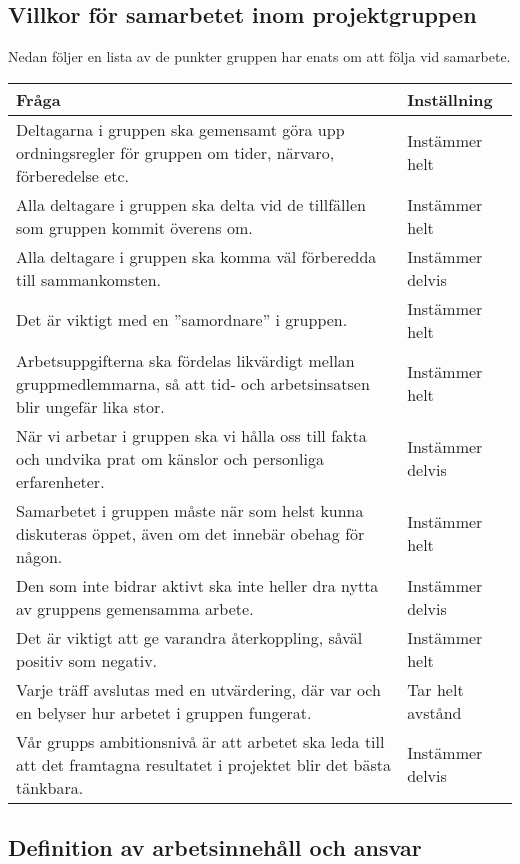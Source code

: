 \documentclass[projektplan/plan.tex]{subfiles}
\begin{document}
\subsection{Villkor för samarbetet inom projektgruppen}
\label{sec:doc}
Nedan följer en lista av de punkter gruppen har enats om att följa vid samarbete.
{\renewcommand{\arraystretch}{1.6}
\begin{longtable}{p{}p{}}
    \bfseries Fråga &
    \bfseries Inställning \\\hline
    Deltagarna i gruppen ska gemensamt göra upp ordningsregler för gruppen om
    tider, närvaro, förberedelse etc. &
    Instämmer helt
    \\
    Alla deltagare i gruppen ska delta vid de tillfällen som gruppen kommit
    överens om. &
    Instämmer helt
    \\
    Alla deltagare i gruppen ska komma väl förberedda till sammankomsten. &
    Instämmer delvis
    \\
    Det är viktigt med en ”samordnare” i gruppen. &
    Instämmer helt
    \\
    Arbetsuppgifterna ska fördelas likvärdigt mellan gruppmedlemmarna, så att
    tid- och arbetsinsatsen blir ungefär lika stor. &
    Instämmer helt
    \\
    När vi arbetar i gruppen ska vi hålla oss till fakta och undvika prat om
    känslor och personliga erfarenheter. &
    Instämmer delvis
    \\
    Samarbetet i gruppen måste när som helst kunna diskuteras öppet, även om
    det innebär obehag för någon. &
    Instämmer helt
    \\
    Den som inte bidrar aktivt ska inte heller dra nytta av gruppens gemensamma
    arbete. &
    Instämmer delvis
    \\
    Det är viktigt att ge varandra återkoppling, såväl positiv som negativ. &
    Instämmer helt
    \\
    Varje träff avslutas med en utvärdering, där var och en belyser hur arbetet
    i gruppen fungerat. &
    Tar helt avstånd
    \\
    Vår grupps ambitionsnivå är att arbetet ska leda till att det framtagna
    resultatet i projektet blir det bästa tänkbara. &
    Instämmer delvis
    \\
    
    \endhead
\end{longtable}}

\noindent
\newpage
\subsection{Definition av arbetsinnehåll och ansvar}
\end{document}
